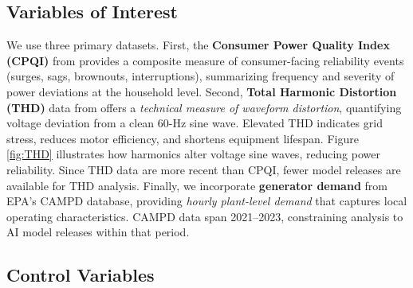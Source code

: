 \documentclass[sigconf,authordraft]{acmart}
\begin{document}
\subsection{Variables of Interest}

We use three primary datasets. First, the \textbf{Consumer Power Quality Index (CPQI)} from \cite{WhiskerLabs_THD_2024} provides a composite measure of consumer-facing reliability events (surges, sags, brownouts, interruptions), summarizing frequency and severity of power deviations at the household level. Second, \textbf{Total Harmonic Distortion (THD)} data from \cite{WhiskerLabs_THD_2024} offers a \emph{technical measure of waveform distortion}, quantifying voltage deviation from a clean 60-Hz sine wave. Elevated THD indicates grid stress, reduces motor efficiency, and shortens equipment lifespan. Figure \ref{fig:THD} illustrates how harmonics alter voltage sine waves, reducing power reliability. Since THD data are more recent than CPQI, fewer model releases are available for THD analysis. Finally, we incorporate \textbf{generator demand} from EPA's CAMPD database, providing \emph{hourly plant-level demand} that captures local operating characteristics. CAMPD data span 2021--2023, constraining analysis to AI model releases within that period.
\subsection{Control Variables}
\end{document}
